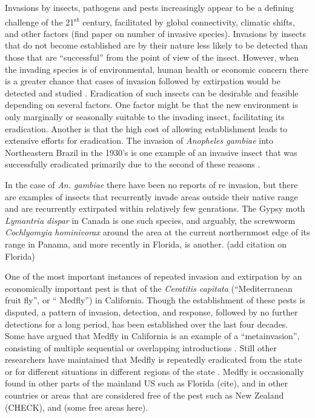 \documentclass[10pt,a4paper,twocolumn]{article}
\begin{document}
Invasions by insects, pathogens and pests increasingly appear to be a 
defining challenge of the 21\textsuperscript{st} century, facilitated by global connectivity, climatic shifts, and
other factors \cite{simberloff_impacts_2013} (find paper on number of invasive species).
Invasions by insects that do not become established are by their nature less
likely to be detected than those that are ``successful''
from the point of view of the insect. However, when the invading species
is of  environmental, human health or economic concern there is a greater
chance that cases of invasion followed by extirpation would be detected and
studied \cite{liebhold_population_2008}. Eradication of such insects
can be desirable and feasible \cite{Myers2000Eradication} depending on several
factors. One factor might be that the new environment is only marginally or 
seasonally suitable to the
invading insect, facilitating its eradication. Another is that the high cost of
allowing establishment leads
to extensive efforts for eradication. The invasion of
\emph{Anopheles gambiae} into Northeastern Brazil in the 1930's \cite{Soper1943Anopheles}
is one example of an invasive insect that was successfully eradicated 
primarily due to the second of these
reasons \cite{Causey1943Ecology,Killeen2002Eradication}.

In the case of \emph{An. gambiae} there have been no reports of
re invasion, but there are examples of insects that
recurrently invade areas outside their native range and are recurrently
extirpated within relatively few 
genrations. The Gypsy moth \emph{Lymantria dispar} in Canada
\cite{Gray2010Hitchhikers} is one such species, and arguably, the screwworm \emph{Cochlyomyia hominivorax}
around the area at the current northernmost edge of its range in Panama, and more recently in Florida,
\cite{Robinson2009Enabling} is another. (add citation on Florida)

One of the most important instances of repeated invasion and extirpation by an economically 
important pest is that of the \textit{Ceratitis capitata} (``Mediterranean fruit fly'', or `` Medfly'') 
in California.  
Though the establishment of these pests is disputed, a pattern of invasion, detection, and response, followed by no further detections for a long period, has been established over the last four decades. 
Some have argued that Medfly in California is an example of a ``metainvasion'', consisting of 
multiple sequential or
overlapping introductions \cite{Davies1999Bioinvasions}. Still other researchers have maintained 
that Medfly is repeatedly eradicated
from the state \cite{Haymer1997Genetic} or for different situations
in different regions of the state
\cite{Bonizzoni2001Microsatellite,Gasperi2002Genetic}. Medfly is occasionally found in 
other parts of the mainland US such as Florida (cite), and in other countries or areas that are considered 
free of the pest such as New Zealand (CHECK), and (some free areas here).
\end{document}
